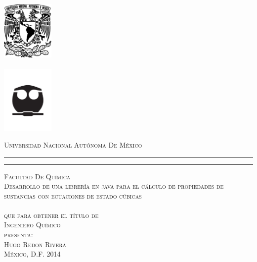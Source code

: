 \begin{titlepage}
	\begin{minipage}[c][9in][s]{1in}
	\centering
	\includegraphics[width=1in]{Escudo-UNAM}\\[10pt]
	\hskip 2pt\vrule width 2pt height 6.7in
	\hskip 1mm\vrule width 1pt height 6.7in\\[10pt]
	\includegraphics[width=1in]{images/FQ.jpg}
	\end{minipage}\hskip 10pt
	\begin{minipage}[c][\textheight][s]{5.125in}
	\centering
	{\textsc{ \large{Universidad Nacional Autónoma De México}}}
	\vspace{3mm}\hrule height2pt
	\vspace{1mm}\hrule height1pt
	\vspace{3mm}
	\textsc{Facultad De Química}\\[3cm]
	\textsc{\Large Desarrollo de una librería en java para el cálculo de propiedades de sustancias con ecuaciones de estado cúbicas}\\[3cm]
	\\[8pt]
	\textsc{ que para obtener el título de }\\[3pt]
	\textsc{ Ingeniero Químico}\\[1cm]
	\textsc{ presenta: }\\[0.3cm]
	\textsc{ Hugo Redon Rivera }\\[0.5cm]
	\vfill
	{\scshape {México, D.F.} \hfill{2014} }	
	\end{minipage}
\end{titlepage}
\newpage
